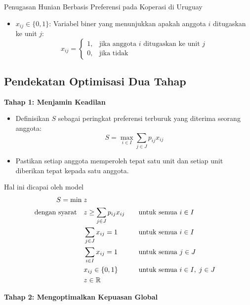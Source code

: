 \begin{casestudybox}{Penugasan Hunian Berbasis Preferensi pada Koperasi di Uruguay}
\begin{itemize}
    \item $x_{ij} \in \{0,1\}$: Variabel biner yang menunjukkan apakah anggota $i$ ditugaskan ke unit $j$:
    \[
    x_{ij} =
    \begin{cases} 
        1, & \text{jika anggota } i \text{ ditugaskan ke unit } j \\ 
        0, & \text{jika tidak} 
    \end{cases}
    \]
\end{itemize}

\subsection*{Pendekatan Optimisasi Dua Tahap}

\textbf{Tahap 1: Menjamin Keadilan}

\begin{itemize}
    \item Definisikan $S$ sebagai peringkat preferensi terburuk yang diterima seorang anggota:
    \[ S = \max_{i \in I} \sum_{j \in J} p_{ij} x_{ij} \]
    \item Pastikan setiap anggota memperoleh tepat satu unit dan setiap unit diberikan tepat kepada satu anggota.
\end{itemize}
Hal ini dicapai oleh model
\begin{align*}
    S = \min \; & z \\
\mbox{dengan syarat}\quad        & z \geq \sum_{j \in J} p_{i j} x_{i j} &&\quad \mbox{untuk semua } i \in I \\
                 & \sum_{j \in J} x_{i j} = 1 &&\quad \mbox{untuk semua } i \in I \\
                 & \sum_{i \in I} x_{i j} = 1 &&\quad \mbox{untuk semua } j \in J \\
                 & x_{i j} \in \{0,1\} &&\quad \mbox{untuk semua } i \in I, \; j \in J \\
                 & z \in \mathbb{R}
\end{align*}

\textbf{Tahap 2: Mengoptimalkan Kepuasan Global}


\end{casestudybox}
